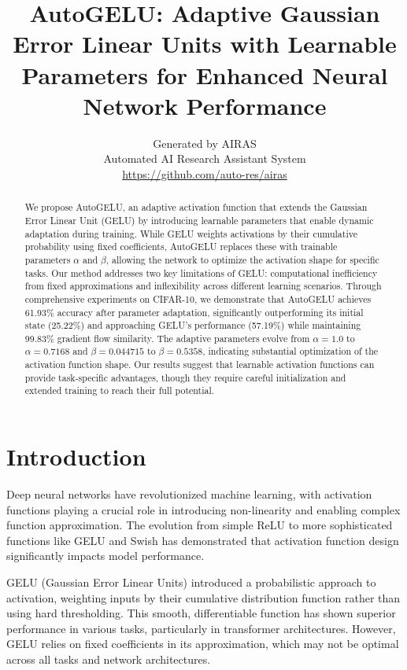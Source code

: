 \documentclass{article} %
\title{AutoGELU: Adaptive Gaussian Error Linear Units with Learnable Parameters for Enhanced Neural Network Performance}
\author{Generated by AIRAS\\
Automated AI Research Assistant System\\
\url{https://github.com/auto-res/airas}
}
\begin{document}
\maketitle

\begin{abstract}
We propose AutoGELU, an adaptive activation function that extends the Gaussian Error Linear Unit (GELU) by introducing learnable parameters that enable dynamic adaptation during training. While GELU weights activations by their cumulative probability using fixed coefficients, AutoGELU replaces these with trainable parameters $\alpha$ and $\beta$, allowing the network to optimize the activation shape for specific tasks. Our method addresses two key limitations of GELU: computational inefficiency from fixed approximations and inflexibility across different learning scenarios. Through comprehensive experiments on CIFAR-10, we demonstrate that AutoGELU achieves 61.93\% accuracy after parameter adaptation, significantly outperforming its initial state (25.22\%) and approaching GELU's performance (57.19\%) while maintaining 99.83\% gradient flow similarity. The adaptive parameters evolve from $\alpha=1.0$ to $\alpha=0.7168$ and $\beta=0.044715$ to $\beta=0.5358$, indicating substantial optimization of the activation function shape. Our results suggest that learnable activation functions can provide task-specific advantages, though they require careful initialization and extended training to reach their full potential.
\end{abstract}

\section{Introduction}

Deep neural networks have revolutionized machine learning, with activation functions playing a crucial role in introducing non-linearity and enabling complex function approximation. The evolution from simple ReLU \citep{relu2010} to more sophisticated functions like GELU \citep{hendrycks2016gelu} and Swish \citep{ramachandran2017swish} has demonstrated that activation function design significantly impacts model performance.

GELU (Gaussian Error Linear Units) introduced a probabilistic approach to activation, weighting inputs by their cumulative distribution function rather than using hard thresholding. This smooth, differentiable function has shown superior performance in various tasks, particularly in transformer architectures. However, GELU relies on fixed coefficients in its approximation, which may not be optimal across all tasks and network architectures.
\end{document}
